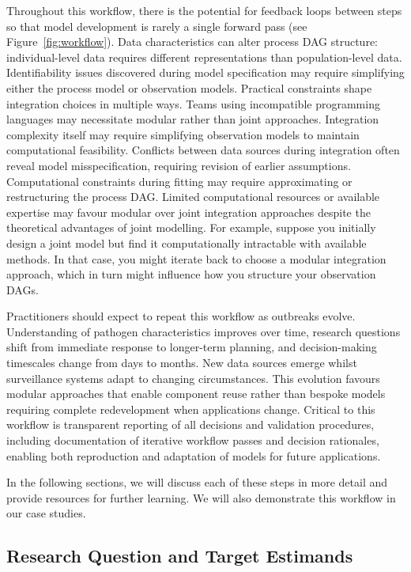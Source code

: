 \documentclass{article}
\begin{document}
Throughout this workflow, there is the potential for feedback loops between steps so that model development is rarely a single forward pass (see Figure~\ref{fig:workflow}). 
Data characteristics can alter process DAG structure: individual-level data requires different representations than population-level data. 
Identifiability issues discovered during model specification may require simplifying either the process model or observation models. 
Practical constraints shape integration choices in multiple ways. Teams using incompatible programming languages may necessitate modular rather than joint approaches. 
Integration complexity itself may require simplifying observation models to maintain computational feasibility. Conflicts between data sources during integration often reveal model misspecification, requiring revision of earlier assumptions. 
Computational constraints during fitting may require approximating or restructuring the process DAG. Limited computational resources or available expertise may favour modular over joint integration approaches despite the theoretical advantages of joint modelling. 
For example, suppose you initially design a joint model but find it computationally intractable with available methods. In that case, you might iterate back to choose a modular integration approach, which in turn might influence how you structure your observation DAGs.

Practitioners should expect to repeat this workflow as outbreaks evolve.
Understanding of pathogen characteristics improves over time, research questions shift from immediate response to longer-term planning, and decision-making timescales change from days to months.
New data sources emerge whilst surveillance systems adapt to changing circumstances.
This evolution favours modular approaches that enable component reuse rather than bespoke models requiring complete redevelopment when applications change.
Critical to this workflow is transparent reporting of all decisions and validation procedures, including documentation of iterative workflow passes and decision rationales, enabling both reproduction and adaptation of models for future applications.

In the following sections, we will discuss each of these steps in more detail and provide resources for further learning. We will also demonstrate this workflow in our case studies.

\subsection{Research Question and Target Estimands}
\end{document}
